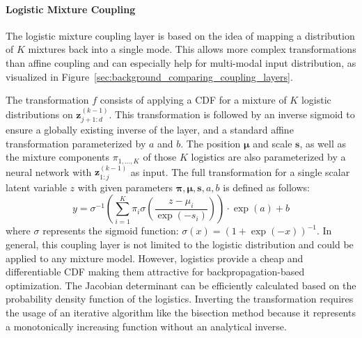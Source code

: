 \paragraph{Logistic Mixture Coupling} The logistic mixture coupling layer is based on the idea of mapping a distribution of $K$ mixtures back into a single mode. This allows more complex transformations than affine coupling and can especially help for multi-modal input distribution, as visualized in Figure~\ref{sec:background_comparing_coupling_layers}.

The transformation $f$ consists of applying a \ac{CDF} for a mixture of $K$ logistic distributions on $\bm{z}^{(k-1)}_{j+1:d}$. This transformation is followed by an inverse sigmoid to ensure a globally existing inverse of the layer, and a standard affine transformation parameterized by $a$ and $b$. The position $\bm{\mu}$ and scale $\bm{s}$, as well as the mixture components $\pi_{1,...,K}$ of those $K$ logistics are also parameterized by a neural network with $\bm{z}^{(k-1)}_{1:j}$ as input. The full transformation for a single scalar latent variable $z$ with given parameters $\bm{\pi}, \bm{\mu}, \bm{s}, a, b$ is defined as follows:
\begin{equation}
    y = \sigma^{-1}\left(\sum_{i=1}^{K} \pi_i \sigma\left(\frac{z-\mu_i}{\exp(-s_i)}\right)\right)\cdot \exp(a)+b
\end{equation}
where $\sigma$ represents the sigmoid function: $\sigma(x)=\left(1+\exp(-x)\right)^{-1}$.
In general, this coupling layer is not limited to the logistic distribution and could be applied to any mixture model. However, logistics provide a cheap and differentiable \ac{CDF} making them attractive for backpropagation-based optimization. 
The Jacobian determinant can be efficiently calculated based on the probability density function of the logistics.
Inverting the transformation requires the usage of an iterative algorithm like the bisection method because it represents a monotonically increasing function without an analytical inverse.

